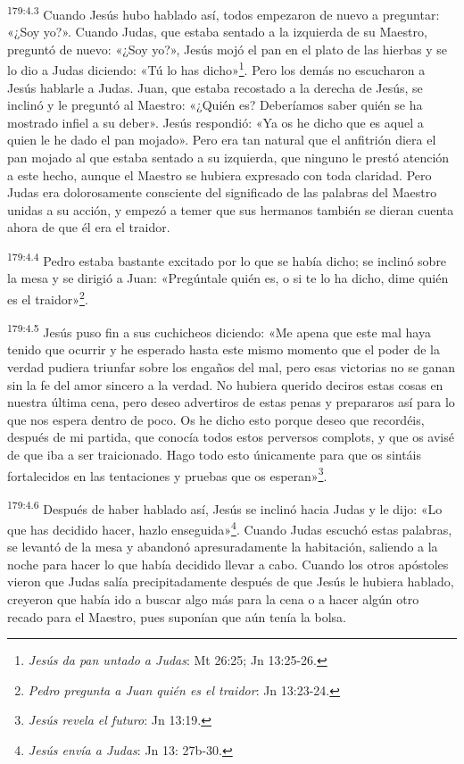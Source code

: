 \par 
\textsuperscript{179:4.3} Cuando Jesús hubo hablado así, todos empezaron de nuevo a preguntar: «¿Soy yo?». Cuando Judas, que estaba sentado a la izquierda de su Maestro, preguntó de nuevo: «¿Soy yo?», Jesús mojó el pan en el plato de las hierbas y se lo dio a Judas diciendo: «Tú lo has dicho»\footnote{\textit{Jesús da pan untado a Judas}: Mt 26:25; Jn 13:25-26.}. Pero los demás no escucharon a Jesús hablarle a Judas. Juan, que estaba recostado a la derecha de Jesús, se inclinó y le preguntó al Maestro: «¿Quién es? Deberíamos saber quién se ha mostrado infiel a su deber». Jesús respondió: «Ya os he dicho que es aquel a quien le he dado el pan mojado». Pero era tan natural que el anfitrión diera el pan mojado al que estaba sentado a su izquierda, que ninguno le prestó atención a este hecho, aunque el Maestro se hubiera expresado con toda claridad. Pero Judas era dolorosamente consciente del significado de las palabras del Maestro unidas a su acción, y empezó a temer que sus hermanos también se dieran cuenta ahora de que él era el traidor.

\par 
\textsuperscript{179:4.4} Pedro estaba bastante excitado por lo que se había dicho; se inclinó sobre la mesa y se dirigió a Juan: «Pregúntale quién es, o si te lo ha dicho, dime quién es el traidor»\footnote{\textit{Pedro pregunta a Juan quién es el traidor}: Jn 13:23-24.}.

\par 
\textsuperscript{179:4.5} Jesús puso fin a sus cuchicheos diciendo: «Me apena que este mal haya tenido que ocurrir y he esperado hasta este mismo momento que el poder de la verdad pudiera triunfar sobre los engaños del mal, pero esas victorias no se ganan sin la fe del amor sincero a la verdad. No hubiera querido deciros estas cosas en nuestra última cena, pero deseo advertiros de estas penas y prepararos así para lo que nos espera dentro de poco. Os he dicho esto porque deseo que recordéis, después de mi partida, que conocía todos estos perversos complots, y que os avisé de que iba a ser traicionado. Hago todo esto únicamente para que os sintáis fortalecidos en las tentaciones y pruebas que os esperan»\footnote{\textit{Jesús revela el futuro}: Jn 13:19.}.

\par 
\textsuperscript{179:4.6} Después de haber hablado así, Jesús se inclinó hacia Judas y le dijo: «Lo que has decidido hacer, hazlo enseguida»\footnote{\textit{Jesús envía a Judas}: Jn 13: 27b-30.}. Cuando Judas escuchó estas palabras, se levantó de la mesa y abandonó apresuradamente la habitación, saliendo a la noche para hacer lo que había decidido llevar a cabo. Cuando los otros apóstoles vieron que Judas salía precipitadamente después de que Jesús le hubiera hablado, creyeron que había ido a buscar algo más para la cena o a hacer algún otro recado para el Maestro, pues suponían que aún tenía la bolsa.

